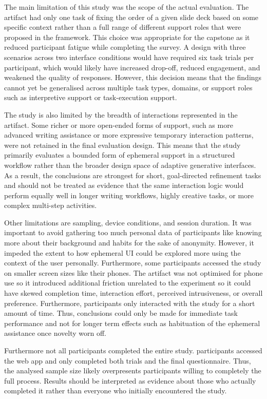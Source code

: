 The main limitation of this study was the scope of the actual evaluation. The artifact had only one task of fixing the order of a given slide deck based on some specific context rather than a full range of different support roles that were proposed in the framework. This choice was appropriate for the capstone as it reduced participant fatigue while completing the survey. A design with three scenarios across two interface conditions would have required six task trials per participant, which would likely have increased drop-off, reduced engagement, and weakened the quality of responses. However, this decision means that the findings cannot yet be generalised across multiple task types, domains, or support roles such as interpretive support or task-execution support.

The study is also limited by the breadth of interactions represented in the artifact. Some richer or more open-ended forms of support, such as more advanced writing assistance or more expressive temporary interaction patterns, were not retained in the final evaluation design. This means that the study primarily evaluates a bounded form of ephemeral support in a structured workflow rather than the broader design space of adaptive generative interfaces. As a result, the conclusions are strongest for short, goal-directed refinement tasks and should not be treated as evidence that the same interaction logic would perform equally well in longer writing workflows, highly creative tasks, or more complex multi-step activities.

Other limitations are sampling, device conditions, and session duration. It was important to avoid gathering too much personal data of participants like knowing more about their background and habits for the sake of anonymity. However, it impeded the extent to how ephemeral UI could be explored more using the context of the user personally. Furthermore, some participants accessed the study on smaller screen sizes like their phones. The artifact was not optimised for phone use so it introduced additional friction unrelated to the experiment so it could have skewed completion time, interaction effort, perceived intrusiveness, or overall preference. Furthermore, participants only interacted with the study for a short amount of time. Thus, conclusions could only be made for immediate task performance and not for longer term effects such as habituation of the ephemeral assistance once novelty worn off. 

Furthermore not all participants completed the entire study. \GenNTotal{} participants accessed the web app and only \GenNValid{} completed both trials and the final questionnaire. Thus, the analysed sample size likely overpresents participants willing to completely the full process. Results should be interpreted as evidence about those who actually completed it rather than everyone who initially encountered the study.

